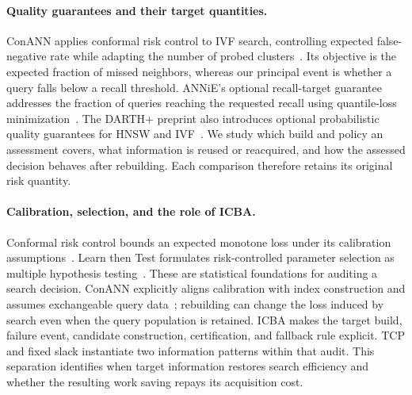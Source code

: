 \paragraph{Quality guarantees and their target quantities.}
ConANN applies conformal risk control to IVF search, controlling expected false-negative rate while adapting the number of probed clusters~\cite{horchidan2025conann}. Its objective is the expected fraction of missed neighbors, whereas our principal event is whether a query falls below a recall threshold. ANNiE's optional recall-target guarantee addresses the fraction of queries reaching the requested recall using quantile-loss minimization~\cite{wang2026annie}. The DARTH+ preprint also introduces optional probabilistic quality guarantees for HNSW and IVF~\cite{chatzakis2026darthplus}. We study which build and policy an assessment covers, what information is reused or reacquired, and how the assessed decision behaves after rebuilding. Each comparison therefore retains its original risk quantity.

\paragraph{Calibration, selection, and the role of ICBA.}
Conformal risk control bounds an expected monotone loss under its calibration assumptions~\cite{angelopoulos2024crc}. Learn then Test formulates risk-controlled parameter selection as multiple hypothesis testing~\cite{angelopoulos2021ltt}. These are statistical foundations for auditing a search decision. ConANN explicitly aligns calibration with index construction and assumes exchangeable query data~\cite{horchidan2025conann}; rebuilding can change the loss induced by search even when the query population is retained. ICBA makes the target build, failure event, candidate construction, certification, and fallback rule explicit. TCP and fixed slack instantiate two information patterns within that audit. This separation identifies when target information restores search efficiency and whether the resulting work saving repays its acquisition cost.
